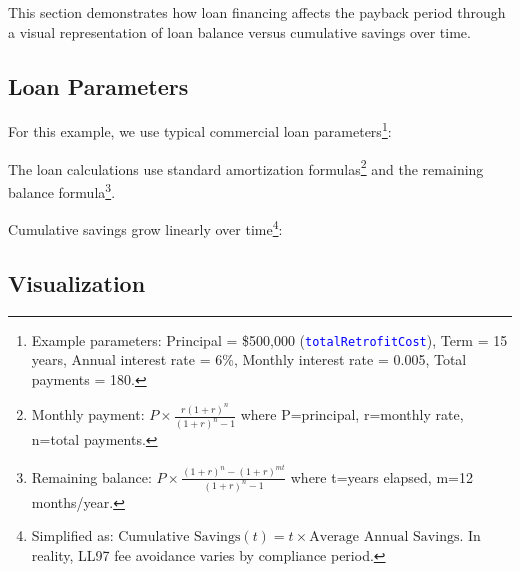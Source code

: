 \documentclass{article}
\newcommand{\code}[1]{\textcolor{blue}{\texttt{#1}}}
\begin{document}
This section demonstrates how loan financing affects the payback period through a visual representation of loan balance versus cumulative savings over time.

\subsection{Loan Parameters}

For this example, we use typical commercial loan parameters\footnote{Example parameters: Principal = \$500,000 (\code{totalRetrofitCost}), Term = 15 years, Annual interest rate = 6\%, Monthly interest rate = 0.005, Total payments = 180.}:

The loan calculations use standard amortization formulas\footnote{Monthly payment: $P \times \frac{r(1+r)^n}{(1+r)^n-1}$ where P=principal, r=monthly rate, n=total payments.} and the remaining balance formula\footnote{Remaining balance: $P \times \frac{(1+r)^n-(1+r)^{mt}}{(1+r)^n-1}$ where t=years elapsed, m=12 months/year.}. 

Cumulative savings grow linearly over time\footnote{Simplified as: $\text{Cumulative Savings}(t) = t \times \text{Average Annual Savings}$. In reality, LL97 fee avoidance varies by compliance period.}:

\subsection{Visualization}
\end{document}
